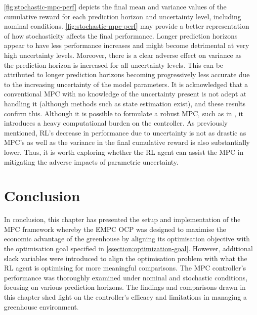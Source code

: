 \autoref{fig:stochastic-mpc-perf} depicts the final mean and variance values of the cumulative reward for each prediction horizon and uncertainty level, including nominal conditions. \autoref{fig:stochastic-mpc-perf} may provide a better representation of how stochasticity affects the final performance. Longer prediction horizons appear to have less performance increases and might become detrimental at very high uncertainty levels. Moreover, there is a clear adverse effect on variance as the prediction horizon is increased for all uncertainty levels. This can be attributed to longer prediction horizons becoming progressively less accurate due to the increasing uncertainty of the model parameters. It is acknowledged that a conventional MPC with no knowledge of the uncertainty present is not adept at handling it (although methods such as state estimation exist), and these results confirm this. Although it is possible to formulate a robust MPC, such as in \citet{boersmaRobustSamplebasedModel2022}, it introduces a heavy computational burden on the controller. As previously mentioned, RL’s decrease in performance due to uncertainty is not as drastic as MPC’s as well as the variance in the final cumulative reward is also substantially lower. Thus, it is worth exploring whether the RL agent can assist the MPC in mitigating the adverse impacts of parametric uncertainty.


\section{Conclusion}

In conclusion, this chapter has presented the setup and implementation of the MPC framework whereby the EMPC OCP was designed to maximise the economic advantage of the greenhouse by aligning its optimisation objective with the optimisation goal specified in \autoref{ssection:optimization-goal}. However, additional slack variables were introduced to align the optimisation problem with what the RL agent is optimising for more meaningful comparisons. The MPC controller’s performance was thoroughly examined under nominal and stochastic conditions, focusing on various prediction horizons. The findings and comparisons drawn in this chapter shed light on the controller’s efficacy and limitations in managing a greenhouse environment.

